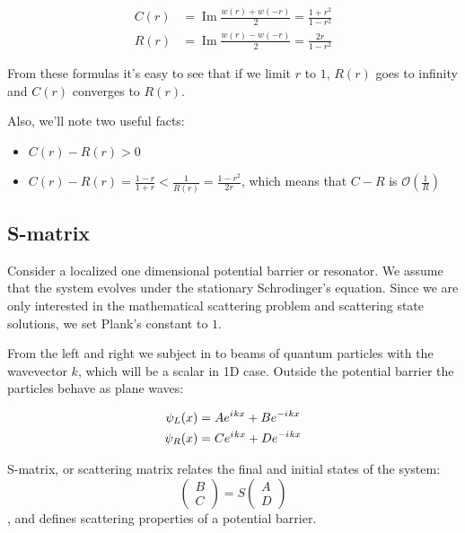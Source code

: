 \documentclass{gCOV2e}
\theoremstyle{plain}%
\theoremstyle{definition}
\theoremstyle{remark}
\newcommand{\mcO}{\mathcal{O}} %
\newcommand{\iu}{{i\mkern1mu}} %
\newcommand{\eexp}[1]{e^{#1}}  %
\renewcommand{\Im}{\operatorname{Im}}
\begin{document}
\begin{equation}\label{eq:c_and_r}
\begin{aligned}
   C(r) &= \Im \frac{w(r) + w(-r)}{2} = \frac{1 + r^2}{1 - r^2}
\\ R(r) &= \Im \frac{w(r) - w(-r)}{2} = \frac{2 r}{1 - r^2}
\end{aligned}
\end{equation}

From these formulas it's easy to see that if we limit $r$ to $1$, $R(r)$ goes to infinity and $C(r)$ converges to $R(r)$.

Also, we'll note two useful facts:
\begin{itemize}
\item $C(r) - R(r) > 0$
\item $C(r) - R(r) = \frac{1 - r}{1 + r} < \frac{1}{R(r)} = \frac{1 - r^2}{2 r}$, which means that $C - R$ is $\mcO(\frac{1}{R})$
\end{itemize}

\subsection{S-matrix}\label{sec:smatrix}
Consider a localized one dimensional potential barrier or resonator. We assume that the system evolves under the stationary Schrodinger's equation. Since we are only interested in the mathematical scattering problem and scattering state solutions, we set Plank's constant to $1$.

From the left and right we subject in to beams of quantum particles with the wavevector $k$, which will be a scalar in 1D case. Outside the potential barrier the particles behave as plane waves:

\begin{equation}\label{eq:wlwl}
\begin{aligned}
   \psi_L(x) &= A \eexp{\iu k x} + B \eexp{-\iu k x}
\\ \psi_R(x) &= C \eexp{\iu k x} + D \eexp{-\iu k x}
\end{aligned}
\end{equation}

S-matrix, or scattering matrix relates the final and initial states of the system:
\begin{equation}\label{eq:smatrix}
\begin{pmatrix} B \\ C \end{pmatrix} = S \begin{pmatrix} A \\ D \end{pmatrix}
\end{equation}
, and defines scattering properties of a potential barrier.
\end{document}
